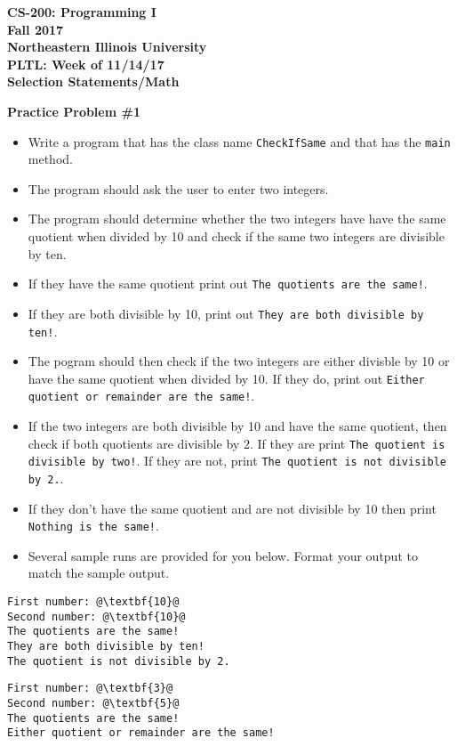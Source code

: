 \documentclass[12pt]{article}
\begin{document}
\begin{center}
	\textbf{CS-200: Programming I}\\
	\textbf{Fall 2017}\\
	\textbf{Northeastern Illinois University}\\
	\textbf{PLTL: Week of 11/14/17}\\
	\textbf{Selection Statements/Math}
\end{center}

\noindent\textbf{Practice Problem \#1}
\begin{itemize}
	\item Write a program that has the class name \texttt{CheckIfSame} and that has the \texttt{main} method.
	\item The program should ask the user to enter two integers.
	\item The program should determine whether the two integers have have the same quotient when divided by 10 and check if the same two integers are divisible by ten.
	\item If they have the same quotient print out \texttt{The quotients are the same!}.
	\item If they are both divisible by 10, print out \texttt{They are both divisible by ten!}.
	\item The pogram should then check if the two integers are either divisble by 10 or have the same quotient when divided by 10. If they do, print out \texttt{Either quotient or remainder are the same!}. 
	\item If the two integers are both divisible by 10 and have the same quotient, then check if both quotients are divisible by 2. If they are print \texttt{The quotient is divisible by two!}. If they are not, print \texttt{The quotient is not divisible by 2.}.
	\item If they don't have the same quotient and are not divisible by 10 then print \texttt{Nothing is the same!}.
	\item Several sample runs are provided for you below. Format your output to match the sample output.
\end{itemize}
\begin{center}
\begin{minipage}{6cm}
\begin{lstlisting}[escapechar=@]
First number: @\textbf{10}@
Second number: @\textbf{10}@
The quotients are the same!
They are both divisible by ten!
The quotient is not divisible by 2.
\end{lstlisting}
\end{minipage}
\hspace*{0.5cm}
\begin{minipage}{7cm}
\begin{lstlisting}[escapechar=@]
First number: @\textbf{3}@
Second number: @\textbf{5}@
The quotients are the same!
Either quotient or remainder are the same!
\end{lstlisting}
\end{minipage}
\end{center}
\end{document}
